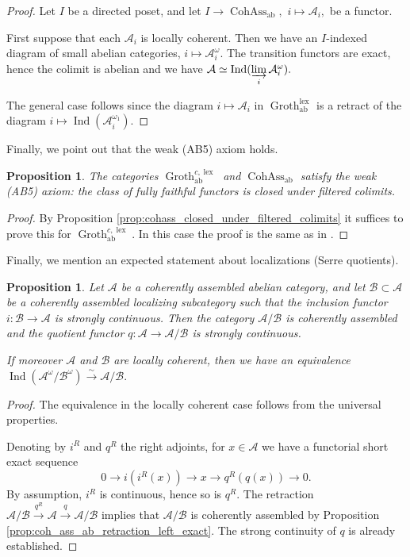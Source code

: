 \documentclass[11pt,leqno]{amsart}
\newtheorem{prop}[theo]{Proposition}
\numberwithin{equation}{section}
\newcommand{\indlim}[1][]{\mathop{\varinjlim}\limits_{#1}}
\newcommand{\xto}{\xrightarrow}
\newcommand{\lex}{\operatorname{lex}}
\newcommand{\Groth}{\operatorname{Groth}}
\newcommand{\cA}{{\mathcal A}}
\newcommand{\cB}{{\mathcal B}}
\newcommand{\Cohass}{\operatorname{CohAss}}
\newcommand{\ab}{\operatorname{ab}}
\newcommand{\Ind}{\operatorname{Ind}}
\begin{document}
\begin{proof}
Let $I$ be a directed poset, and let $I\to\Cohass_{\ab},$ $i\mapsto\cA_i,$ be a functor.

First suppose that each $\cA_i$ is locally coherent. Then we have an $I$-indexed diagram of small abelian categories, $i\mapsto\cA_i^{\omega}.$ The transition functors are exact, hence the colimit is abelian and we have $\cA\simeq\Ind(\indlim[i]\cA_i^{\omega}).$ 

The general case follows since the diagram $i\mapsto\cA_i$ in $\Groth^{\lex}_{\ab}$ is a retract of the diagram $i\mapsto\Ind(\cA_i^{\omega_1}).$
\end{proof}

Finally, we point out that the weak (AB5) axiom holds.

\begin{prop}\label{prop:weak_AB5_Groth_cohass}
The categories $\Groth^{c,\lex}_{\ab}$ and $\Cohass_{\ab}$ satisfy the weak (AB5) axiom: the class of fully faithful functors is closed under filtered colimits.
\end{prop}

\begin{proof}
By Proposition \ref{prop:cohass_closed_under_filtered_colimits} it suffices to prove this for $\Groth^{c,\lex}_{\ab}.$ In this case the proof is the same as in \cite[Proposition 1.67]{E24}.
\end{proof}

Finally, we mention an expected statement about localizations (Serre quotients).

\begin{prop}\label{prop:Serre_quotient_coh_ass}
Let $\cA$ be a coherently assembled abelian category, and let $\cB\subset\cA$ be a coherently assembled localizing subcategory such that the inclusion functor $i:\cB\to\cA$ is strongly continuous. Then the category $\cA/\cB$ is coherently assembled and the quotient functor $q:\cA\to\cA/\cB$ is strongly continuous.

If moreover $\cA$ and $\cB$ are locally coherent, then we have an equivalence $\Ind(\cA^{\omega}/\cB^{\omega})\xto{\sim}\cA/\cB.$
\end{prop}

\begin{proof}
The equivalence in the locally coherent case follows from the universal properties.

Denoting by $i^R$ and $q^R$ the right adjoints, for $x\in\cA$ we have a functorial short exact sequence
\begin{equation*}
0\to i(i^R(x))\to x\to q^R(q(x))\to 0.
\end{equation*}
By assumption, $i^R$ is continuous, hence so is $q^R.$ The retraction $\cA/\cB\xto{q^R}\cA\xto{q}\cA/\cB$ implies that $\cA/\cB$ is coherently assembled by Proposition \ref{prop:coh_ass_ab_retraction_left_exact}. The strong continuity of $q$ is already established.
\end{proof}
\end{document}
